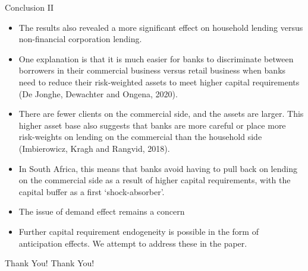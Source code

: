 \documentclass[
  14,
  ignorenonframetext,
  aspectratio=141,
]{beamer}
\providecommand{\tightlist}{%
  \setlength{\itemsep}{0pt}\setlength{\parskip}{0pt}}
\begin{document}
\begin{frame}{Conclusion II}
\protect\hypertarget{conclusion-ii}{}
\begin{itemize}
\tightlist
\item
  The results also revealed a more significant effect on household
  lending versus non-financial corporation lending.
\item
  One explanation is that it is much easier for banks to discriminate
  between borrowers in their commercial business versus retail business
  when banks need to reduce their risk-weighted assets to meet higher
  capital requirements (De Jonghe, Dewachter and Ongena, 2020).
\item
  There are fewer clients on the commercial side, and the assets are
  larger. This higher asset base also suggests that banks are more
  careful or place more risk-weights on lending on the commercial than
  the household side (Imbierowicz, Kragh and Rangvid, 2018).
\item
  In South Africa, this means that banks avoid having to pull back on
  lending on the commercial side as a result of higher capital
  requirements, with the capital buffer as a first `shock-absorber'.
\item
  The issue of demand effect remains a concern
\item
  Further capital requirement endogeneity is possible in the form of
  anticipation effects. We attempt to address these in the paper.
\end{itemize}
\end{frame}

\begin{frame}{Thank You!}
\protect\hypertarget{thank-you}{}
\centering Thank You!
\end{frame}
\end{document}

